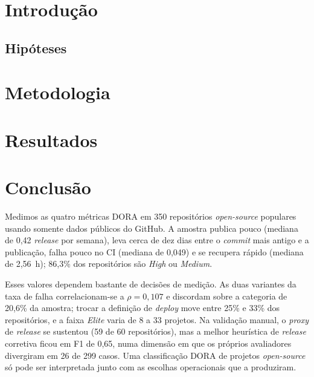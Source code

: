 \documentclass[12pt]{article}
\begin{document}
\section{Introdução}



\subsection{Hipóteses}



\section{Metodologia}





\section{Resultados}








\section{Conclusão}

Medimos as quatro métricas DORA em 350 repositórios \textit{open-source} populares usando
somente dados públicos do GitHub. A amostra publica pouco (mediana de 0,42 \textit{release} por
semana), leva cerca de dez dias entre o \textit{commit} mais antigo e a publicação, falha pouco
no CI (mediana de 0,049) e se recupera rápido (mediana de 2,56~h); 86,3\% dos repositórios são
\textit{High} ou \textit{Medium}.

Esses valores dependem bastante de decisões de medição. As duas variantes da taxa de falha
correlacionam-se a $\rho = 0{,}107$ e discordam sobre a categoria de 20,6\% da amostra; trocar
a definição de \textit{deploy} move entre 25\% e 33\% dos repositórios, e a faixa
\textit{Elite} varia de 8 a 33 projetos. Na validação manual, o \textit{proxy} de \textit{release} se sustentou (59 de 60
repositórios), mas a melhor heurística de \textit{release} corretiva ficou em F1 de 0,65, numa
dimensão em que os próprios avaliadores divergiram em 26 de 299 casos. Uma classificação DORA
de projetos \textit{open-source} só pode ser interpretada junto com as escolhas operacionais
que a produziram.
\end{document}
